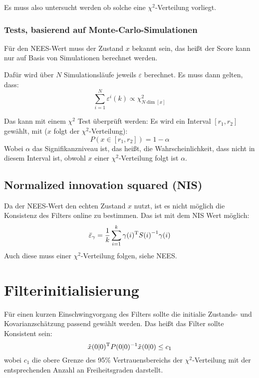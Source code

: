 Es muss also untersucht werden ob solche eine $\chi^2$-Verteilung vorliegt.

\subsubsection{Tests, basierend auf Monte-Carlo-Simulationen}
Für den NEES-Wert muss der Zustand $x$ bekannt sein, das heißt der Score kann nur auf Basis von Simulationen berechnet
werden.

Dafür wird über $N$ Simulationsläufe jeweils $\varepsilon$ berechnet. Es muss dann gelten,
dass:
\begin{equation*}
    \sum_{i=1}^N \varepsilon^i(k) \propto \chi^2_{N \dim[x]}
\end{equation*}

Das kann mit einem $\chi^2$ Test überprüft werden:
Es wird ein Interval $[r_1, r_2]$ gewählt, mit ($x$ folgt der $\chi^2$-Verteilung):
\begin{equation*}
    P(x \in [r_1, r_2]) = 1 - \alpha
\end{equation*}
Wobei $\alpha$ das Signifikanzniveau ist, das heißt, die Wahrscheinlichkeit, dass nicht in diesem Interval ist, obwohl $x$ einer $\chi^2$-Verteilung folgt ist $\alpha$.

\subsection{Normalized innovation squared (NIS)}
Da der NEES-Wert den echten Zustand $x$ nutzt, ist es nicht möglich die Konsistenz des Filters online zu bestimmen. Das ist mit dem NIS Wert möglich:
\begin{equation*}
    \bar{\varepsilon}_\gamma = \frac{1}{k} \sum_{i=1}^k \gamma(i)^\text{T} {S(i)}^{-1} \gamma(i)
\end{equation*}
Auch diese muss einer $\chi^2$-Verteilung folgen, siehe NEES.

\section{Filterinitialisierung}
Für einen kurzen Einschwingvorgang des Filters sollte die initialie Zustands- und Kovarianzschätzung passend gewählt werden. Das heißt das Filter sollte Konsistent sein:
\begin{equation*}
    \tilde{x}(0|0)^\text{T} {P(0|0)^{-1}} \tilde{x}(0|0) \leq c_1
\end{equation*}
wobei $c_1$ die obere Grenze des 95\% Vertrauensbereichs der $\chi^2$-Verteilung 
mit der entsprechenden Anzahl an Freiheitsgraden darstellt.

